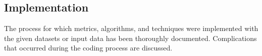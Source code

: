 \subsection{Implementation}
The process for which metrics, algorithms, and techniques were implemented with the given datasets or input data has been thoroughly documented. Complications that occurred during the coding process are discussed.
